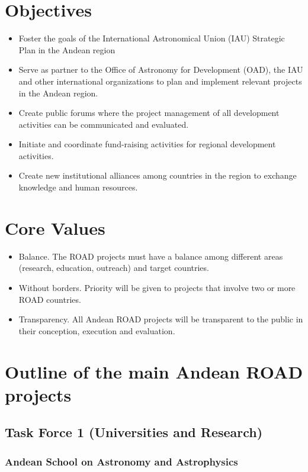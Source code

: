 \documentclass[12pt]{article}
\begin{document}
\section{Objectives}
\begin{itemize}
\item
Foster the goals of the International Astronomical Union (IAU) Strategic Plan in the Andean region
\item
Serve as partner to the Office of Astronomy for Development (OAD), the IAU and other international
organizations to plan and implement relevant projects in the Andean
region. 
\item
Create public forums where the project management of all development
activities can be communicated and evaluated. 
\item
Initiate and coordinate fund-raising activities for regional
development activities. 
\item
Create new institutional alliances among countries in the region to
exchange knowledge and human resources. 
\end{itemize}

\section{Core Values}
\begin{itemize}
\item 
Balance. The ROAD projects must have a balance among different areas
(research, education, outreach) and target countries. 
\item
Without borders. Priority will be given to projects that involve two
or more ROAD countries. 
\item
Transparency. All Andean ROAD projects will be transparent to the
public in their conception, execution and evaluation. 
\end{itemize}




\section{Outline of the main Andean ROAD projects}

\subsection{Task Force 1 (Universities and Research)}

\subsubsection{Andean School on Astronomy and Astrophysics}
\end{document}
